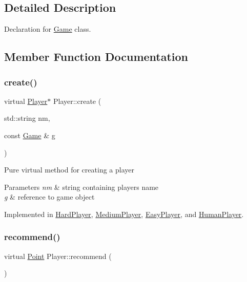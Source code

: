 \subsection{Detailed Description}
Declaration for \mbox{\hyperlink{class_game}{Game}} class. 

\subsection{Member Function Documentation}
\mbox{\label{class_player_a9b9133f3347894da1416953048cecdb2}} 
\subsubsection{\texorpdfstring{create()}{create()}}
{\footnotesize\ttfamily virtual \mbox{\hyperlink{class_player}{Player}}$\ast$ Player\+::create (\begin{DoxyParamCaption}\item[{std\+::string}]{nm,  }\item[{const \mbox{\hyperlink{class_game}{Game}} \&}]{g }\end{DoxyParamCaption})\hspace{0.3cm}{\ttfamily [pure virtual]}}

Pure virtual method for creating a player 
\begin{DoxyParams}{Parameters}
{\em nm} & string containing player\textquotesingle{}s name \\
\hline
{\em g} & reference to game object \\
\hline
\end{DoxyParams}


Implemented in \mbox{\hyperlink{class_hard_player_ab3e76893b9c5163a33ea91b201715a98}{Hard\+Player}}, \mbox{\hyperlink{class_medium_player_a6a51f6bab42f57e8af235f2ab196d74e}{Medium\+Player}}, \mbox{\hyperlink{class_easy_player_ae927ab9f7f4d152fd457e037ad7828a5}{Easy\+Player}}, and \mbox{\hyperlink{class_human_player_ac369ccb03a62b40dcf3dc157841a965e}{Human\+Player}}.

\mbox{\label{class_player_a2cc7a83d11158eafd8d49d4b9f23ce56}} 
\subsubsection{\texorpdfstring{recommend()}{recommend()}}
{\footnotesize\ttfamily virtual \mbox{\hyperlink{class_point}{Point}} Player\+::recommend (\begin{DoxyParamCaption}{ }\end{DoxyParamCaption})\hspace{0.3cm}{\ttfamily [pure virtual]}}

